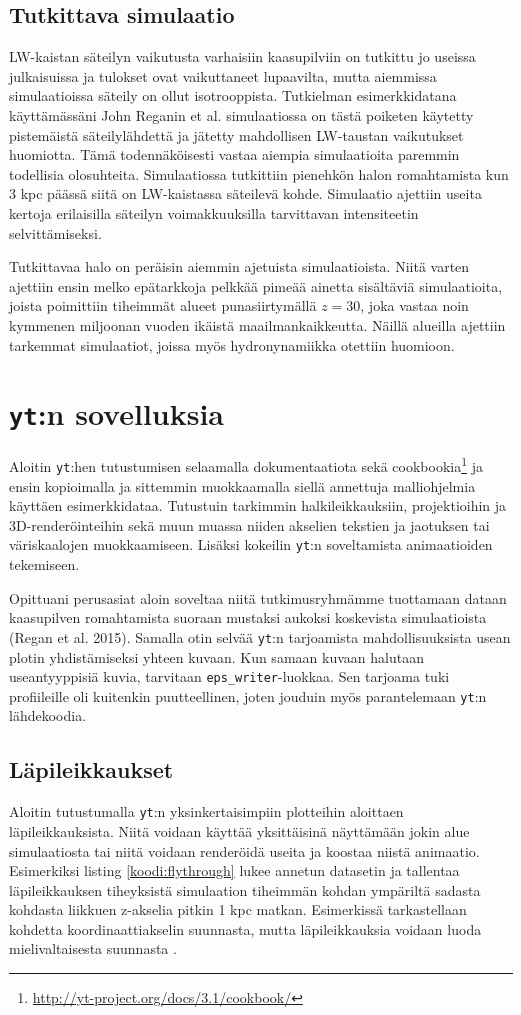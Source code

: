 \documentclass[12pt,a4paper]{article}
\newcommand{\yt}{\texttt{yt}}
\begin{document}
\subsection{Tutkittava simulaatio}
LW-kaistan säteilyn vaikutusta varhaisiin kaasupilviin on tutkittu jo useissa julkaisuissa ja tulokset ovat vaikuttaneet lupaavilta, mutta aiemmissa simulaatioissa säteily on ollut isotrooppista. Tutkielman esimerkkidatana käyttämässäni John Reganin et al. simulaatiossa on tästä poiketen käytetty pistemäistä säteilylähdettä ja jätetty mahdollisen LW-taustan vaikutukset huomiotta. Tämä todennäköisesti vastaa aiempia simulaatioita paremmin todellisia olosuhteita. Simulaatiossa tutkittiin pienehkön halon romahtamista kun 3 kpc päässä siitä on LW-kaistassa säteilevä kohde. Simulaatio ajettiin useita kertoja erilaisilla säteilyn voimakkuuksilla tarvittavan intensiteetin selvittämiseksi. \cite{rj}

Tutkittavaa halo on peräisin aiemmin ajetuista simulaatioista. Niitä varten ajettiin ensin melko epätarkkoja pelkkää pimeää ainetta sisältäviä simulaatioita, joista poimittiin tiheimmät alueet punasiirtymällä $z=30$, joka vastaa noin kymmenen miljoonan vuoden ikäistä maailmankaikkeutta. Näillä alueilla ajettiin tarkemmat simulaatiot, joissa myös hydronynamiikka otettiin huomioon. \cite{rj}

\section{\yt :n sovelluksia}
Aloitin \yt :hen tutustumisen selaamalla dokumentaatiota sekä cookbookia\footnote{\url{http://yt-project.org/docs/3.1/cookbook/}} ja ensin kopioimalla ja sittemmin muokkaamalla siellä annettuja malliohjelmia käyttäen esimerkkidataa. Tutustuin tarkimmin halkileikkauksiin, projektioihin ja 3D-renderöinteihin sekä muun muassa niiden akselien tekstien ja jaotuksen tai väriskaalojen muokkaamiseen. Lisäksi kokeilin \yt :n soveltamista animaatioiden tekemiseen.

Opittuani perusasiat aloin soveltaa niitä tutkimusryhmämme tuottamaan dataan kaasupilven romahtamista suoraan mustaksi aukoksi koskevista simulaatioista (Regan et al. 2015). Samalla otin selvää \yt :n tarjoamista mahdollisuuksista usean plotin yhdistämiseksi yhteen kuvaan. Kun samaan kuvaan halutaan useantyyppisiä kuvia, tarvitaan \texttt{eps\_writer}-luokkaa. Sen tarjoama tuki profiileille oli kuitenkin puutteellinen, joten jouduin myös parantelemaan \yt :n lähdekoodia.

\subsection{Läpileikkaukset}
Aloitin tutustumalla \yt :n yksinkertaisimpiin plotteihin aloittaen läpileikkauksista. Niitä voidaan käyttää yksittäisinä näyttämään jokin alue simulaatiosta tai niitä voidaan renderöidä useita ja koostaa niistä animaatio. Esimerkiksi listing \ref{koodi:flythrough} lukee annetun datasetin ja tallentaa läpileikkauksen tiheyksistä simulaation tiheimmän kohdan ympäriltä sadasta kohdasta liikkuen z-akselia pitkin 1 kpc matkan. Esimerkissä tarkastellaan kohdetta koordinaattiakselin suunnasta, mutta läpileikkauksia voidaan luoda mielivaltaisesta suunnasta \cite{sliceproj}.
\end{document}
